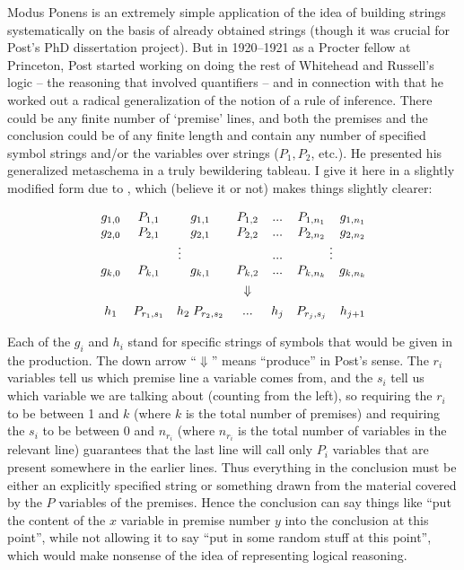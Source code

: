 \documentclass[output=paper]{langscibook}
\begin{document}
Modus Ponens is an extremely simple application of the idea of building strings systematically on the basis of already obtained strings (though it was crucial for Post's PhD dissertation project). But in 1920--1921 as a Procter fellow at Princeton, Post started working on doing the rest of Whitehead and Russell's logic – the reasoning that involved quantifiers – and in connection with that he worked out a radical generalization of the notion of a rule of inference. There could be any finite number of `premise' lines, and both the premises and the conclusion could be of any finite length and contain any number of specified symbol strings and/or the variables over strings ($P_1, P_2$, etc.). He presented his generalized metaschema in a truly bewildering tableau. I give it here in a slightly modified form due to \citet{Davis82}, which (believe it or not) makes things slightly clearer:

\large
\begin{displaymath}
\begin{array}{ccccccc} g_{1,0} & P_{1,1} & g_{1,1} & P_{1,2}  & . . . & P_{1,n_1} & g_{1,n_1} \\ g_{2,0} & P_{2,1} & g_{2,1} & P_{2,2}  & . . . & P_{2,n_2} & g_{2,n_2} \\ \multicolumn{4}{c}{\vdots}             & . . . & \multicolumn{2}{c}{\vdots} \\ g_{k,0} & P_{k,1} & g_{k,1} & P_{k,2}  & . . . & P_{k,n_k} & g_{k,n_k}\\[1ex]         &         &         &\Downarrow&       &           & \\[1ex] h_1 & P_{r_1,s_1} & h_2 \; P_{r_2,s_2} & . . . & h_j & P_{r_j,s_j} & h_{j+1} \end{array} \end{displaymath}

\normalsize\smallskip\noindent  Each of the $g_i$ and $h_i$ stand for specific strings of symbols that would be given in the production. The down arrow ``$\Downarrow$'' means ``produce'' in Post's sense. The $r_i$ variables tell us which premise line a variable comes from, and the $s_i$ tell us which variable we are talking about (counting from the left), so requiring the $r_i$ to be between 1 and $k$ (where $k$ is the total number of premises) and requiring the $s_i$ to be between 0 and $n_{r_i}$ (where $n_{r_i}$ is the total number of variables in the relevant line) guarantees that the last line will call only $P_i$ variables that are present somewhere in the earlier lines. Thus everything in the conclusion must be either an explicitly specified string or something drawn from the material covered by the $P$ variables of the premises. Hence the conclusion can say things like ``put the content of the $x$ variable in premise number $y$ into the conclusion at this point'', while not allowing it to say ``put in some random stuff at this point'', which would make nonsense of the idea of representing logical reasoning.
\end{document}
